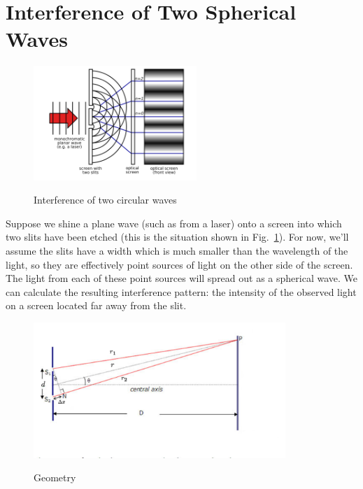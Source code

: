 \documentclass[12pt]{article}
\begin{document}
\section{Interference of Two Spherical Waves}

\begin{figure}[thb]
\begin{center}
{\includegraphics[width=0.55\textwidth]{figs/interference.png}}
\end{center}
\caption{\label{fig:interference} Interference of two circular waves}
\end{figure}

Suppose we shine a plane wave (such as from a laser) onto a screen into which two slits have been etched (this is the situation shown in Fig.~\ref{fig:interference}).  For now, we'll assume the slits have a width which is much smaller than the wavelength of the light, so they are effectively point sources of light on the other side of the screen.  The light from each of these point sources will spread out as a spherical wave.  We can calculate the resulting interference pattern:  the intensity of the observed light on a screen located far away from the slit.

\begin{figure}[thb]
\begin{center}
{\includegraphics[width=0.85\textwidth]{figs/two-slit-geometry.pdf}}
\end{center}
\caption{\label{fig:geo} Geometry}
\end{figure}
\end{document}
